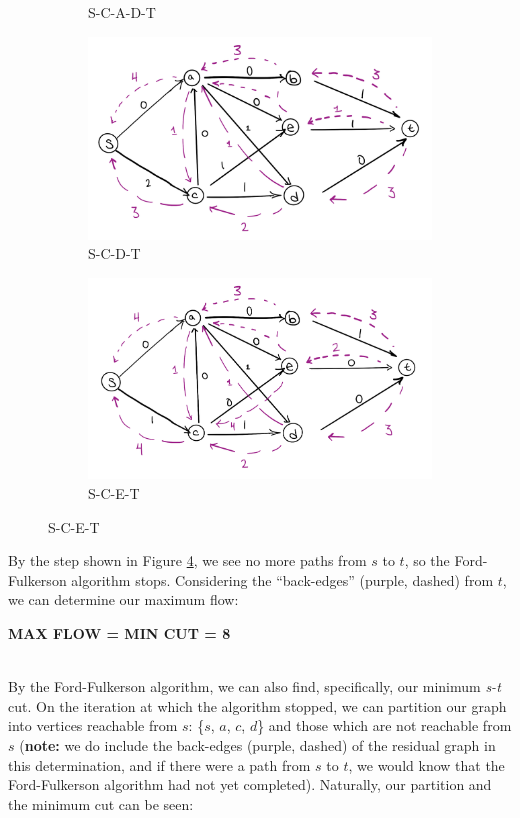 \documentclass[conference]{styles/acmsiggraph}
\newcommand{\?}{\stackrel{?}{=}}
\DeclareRobustCommand{\mybox}[2][gray!20]{%
\begin{tcolorbox}[   %
        breakable,
        left=0pt,
        right=0pt,
        top=0pt,
        bottom=0pt,
        colback=#1,
        colframe=#1,
        width=\dimexpr\textwidth\relax, 
        enlarge left by=0mm,
        boxsep=5pt,
        arc=0pt,outer arc=0pt,
        ]
        #2
\end{tcolorbox}
}
\begin{document}
\begin{figure}[h!]
\begin{subfigure}[b]{0.4\columnwidth}
        \caption{S-C-A-D-T}
        \label{fig:2.3}
    \end{subfigure}
    \begin{subfigure}[b]{0.4\columnwidth}
        \includegraphics[width=.92\linewidth]{P2 Figs/2.4.PNG}
        \caption{S-C-D-T}
        \label{fig:2.4}
    \end{subfigure}
    \begin{subfigure}[b]{0.4\columnwidth}
        \includegraphics[width=.92\linewidth]{P2 Figs/2.5.PNG}
        \caption{S-C-E-T}
        \label{fig:2.5}
    \end{subfigure}
\end{figure}
\FloatBarrier

By the step shown in Figure \ref{fig:2.5}, we see no more paths from $s$ to $t$, so the Ford-Fulkerson algorithm stops.
Considering the \enquote{back-edges} (purple, dashed) from $t$, we can determine our maximum flow:\\

\mybox{\centering \textbf{MAX FLOW = MIN CUT = 8}}\\

By the Ford-Fulkerson algorithm, we can also find, specifically, our minimum \textit{s-t} cut.  On the iteration at which the algorithm stopped, we can partition our graph into vertices reachable from $s$: \{$s$, $a$, $c$, $d$\} and those which are not reachable from $s$ (\textbf{note:} we do include the back-edges (purple, dashed) of the residual graph in this determination, and if there were a path from $s$ to $t$, we would know that the Ford-Fulkerson algorithm had not yet completed). Naturally, our partition and the minimum cut can be seen:
\end{document}
